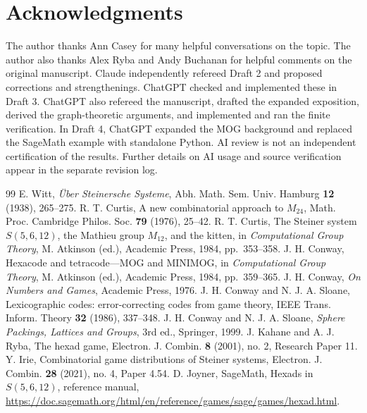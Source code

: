 \documentclass[12pt,letterpaper]{article}
\theoremstyle{definition}\newtheorem{example}[theorem]{Example}
\numberwithin{equation}{section}
\begin{document}
\section*{Acknowledgments}
The author thanks Ann Casey for many helpful conversations on the topic. The author also thanks Alex Ryba and Andy Buchanan for helpful comments on the original manuscript. Claude independently refereed Draft 2 and proposed corrections and strengthenings. ChatGPT checked and implemented these in Draft 3. ChatGPT also refereed the manuscript, drafted the expanded exposition, derived the graph-theoretic arguments, and implemented and ran the finite verification. In Draft 4, ChatGPT expanded the MOG background and replaced the SageMath example with standalone Python. AI review is not an independent certification of the results. Further details on AI usage and source verification appear in the separate revision log.

\begin{thebibliography}{99}
 E. Witt, \emph{\"Uber Steinersche Systeme}, Abh. Math. Sem. Univ. Hamburg \textbf{12} (1938), 265--275.
 R. T. Curtis, A new combinatorial approach to $M_{24}$, Math. Proc. Cambridge Philos. Soc. \textbf{79} (1976), 25--42.
 R. T. Curtis, The Steiner system $S(5,6,12)$, the Mathieu group $M_{12}$, and the kitten, in \emph{Computational Group Theory}, M. Atkinson (ed.), Academic Press, 1984, pp.~353--358.
 J. H. Conway, Hexacode and tetracode---MOG and MINIMOG, in \emph{Computational Group Theory}, M. Atkinson (ed.), Academic Press, 1984, pp.~359--365.
 J. H. Conway, \emph{On Numbers and Games}, Academic Press, 1976.
 J. H. Conway and N. J. A. Sloane, Lexicographic codes: error-correcting codes from game theory, IEEE Trans. Inform. Theory \textbf{32} (1986), 337--348.
 J. H. Conway and N. J. A. Sloane, \emph{Sphere Packings, Lattices and Groups}, 3rd ed., Springer, 1999.
 J. Kahane and A. J. Ryba, The hexad game, Electron. J. Combin. \textbf{8} (2001), no. 2, Research Paper 11.
 Y. Irie, Combinatorial game distributions of Steiner systems, Electron. J. Combin. \textbf{28} (2021), no. 4, Paper 4.54.
 D. Joyner, SageMath, Hexads in $S(5,6,12)$, reference manual, \url{https://doc.sagemath.org/html/en/reference/games/sage/games/hexad.html}.
\end{thebibliography}
\end{document}
